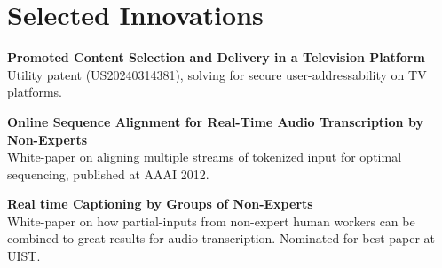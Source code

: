 
\section{Selected Innovations}

  \textbf{Promoted Content Selection and Delivery in a Television Platform} \\
  Utility patent (US20240314381), solving for secure user-addressability on TV platforms.\\

  \vspace{10pt}    

  \textbf{Online Sequence Alignment for Real-Time Audio Transcription by Non-Experts} \\
  White-paper on aligning multiple streams of tokenized input for optimal sequencing, published at AAAI 2012.

  \vspace{10pt}    

  \textbf{Real time Captioning by Groups of Non-Experts} \\
  White-paper on how partial-inputs from non-expert human workers can be combined to great results for audio transcription. Nominated for best paper at UIST.
  